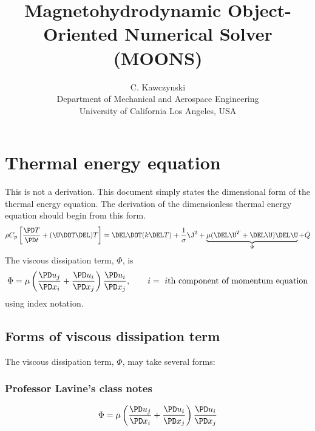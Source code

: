 \documentclass[11pt]{article}
\begin{document}
\doublespacing
\title{Magnetohydrodynamic Object-Oriented Numerical Solver (MOONS)}
\author{C. Kawczynski \\
Department of Mechanical and Aerospace Engineering \\
University of California Los Angeles, USA\\
}
\maketitle

\section{Thermal energy equation}
This is not a derivation. This document simply states the dimensional form of the thermal energy equation. The derivation of the dimensionless thermal energy equation should begin from this form.
\begin{equation}
\rho C_p \left[ \frac{\PD T}{\PD t} 
+ (\U \DOT \DEL) T \right] 
= \DEL \DOT (k \DEL T) 
+ \frac{1}{\sigma} \J^2 
+ \underbrace{\mu ( \DEL \U^T + \DEL \U ) \DEL \U}_{\Phi}
+ \dot{Q}
\end{equation}
The viscous dissipation term, $\Phi$, is 
\begin{equation}
\Phi=\mu \left( \frac{\PD u_j}{\PD x_i}+\frac{\PD u_i}{\PD x_j} \right) \frac{\PD u_i}{\PD x_j}, \qquad i=\text{ $i$th component of momentum equation}
\end{equation}
using index notation.

\subsection{Forms of viscous dissipation term}
The viscous dissipation term, $\Phi$, may take several forms:

\subsubsection{Professor Lavine's class notes}
\begin{equation}
\Phi=\mu \left( \frac{\PD u_j}{\PD x_i}+\frac{\PD u_i}{\PD x_j} \right) \frac{\PD u_i}{\PD x_j}
\end{equation}
\end{document}
